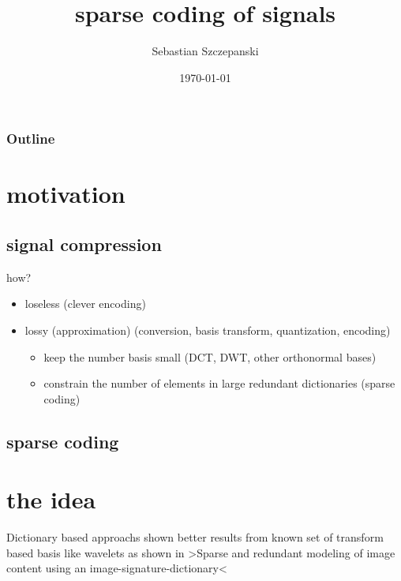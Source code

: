 




\title{sparse coding of signals}
\author{Sebastian Szczepanski}
\date{\today}

\begin{frame}
\titlepage
\end{frame}

\begin{frame}
\frametitle{Outline}
\tableofcontents %
\end{frame}


\section{motivation}
\subsection{signal compression}
\begin{frame}
how? 
\begin{itemize}
\item loseless (clever encoding) 
\item lossy (approximation) (conversion, basis transform, quantization, encoding) \
\pause
	\begin{itemize}
	\item  keep the number basis small (DCT, DWT, other orthonormal bases)	
	\pause
	\item constrain the number of elements in large redundant dictionaries (sparse coding)
	\end{itemize}
\end{itemize}
\end{frame}

\subsection{sparse coding}



\section{the idea}
\begin{frame}

Dictionary based approachs shown better results from known set of transform based basis like wavelets
as shown in >Sparse and redundant modeling of image content using an image-signature-dictionary<
\end{frame}

